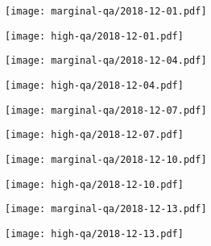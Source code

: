 \documentclass{article}
\begin{document}
\begin{figure}[H]
	\ContinuedFloat
	\centering
	\begin{subfigure}{0.48\linewidth}
		\texttt{[image: marginal-qa/2018-12-01.pdf]}
	\end{subfigure}
	\begin{subfigure}{0.48\linewidth}
		\texttt{[image: high-qa/2018-12-01.pdf]}
	\end{subfigure}
	\begin{subfigure}{0.48\linewidth}
		\texttt{[image: marginal-qa/2018-12-04.pdf]}
	\end{subfigure}
	\begin{subfigure}{0.48\linewidth}
		\texttt{[image: high-qa/2018-12-04.pdf]}
	\end{subfigure}
	\begin{subfigure}{0.48\linewidth}
		\texttt{[image: marginal-qa/2018-12-07.pdf]}
	\end{subfigure}
	\begin{subfigure}{0.48\linewidth}
		\texttt{[image: high-qa/2018-12-07.pdf]}
	\end{subfigure}
	\begin{subfigure}{0.48\linewidth}
		\texttt{[image: marginal-qa/2018-12-10.pdf]}
	\end{subfigure}
	\begin{subfigure}{0.48\linewidth}
		\texttt{[image: high-qa/2018-12-10.pdf]}
	\end{subfigure}
	\begin{subfigure}{0.48\linewidth}
		\texttt{[image: marginal-qa/2018-12-13.pdf]}
	\end{subfigure}
	\begin{subfigure}{0.48\linewidth}
		\texttt{[image: high-qa/2018-12-13.pdf]}
	\end{subfigure}
\end{figure}
\end{document}
